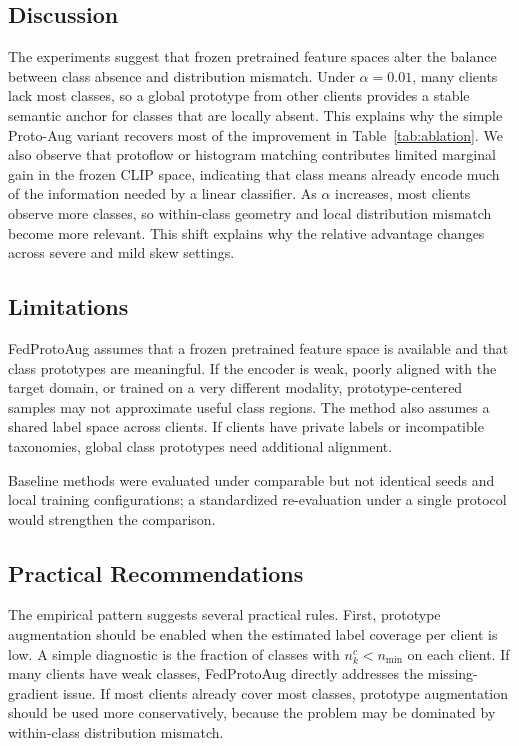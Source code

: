 ﻿\documentclass[runningheads]{llncs}
\newcommand{\method}{FedProtoAug}
\newcommand{\clip}{CLIP}
\begin{document}
\subsection{Discussion}
The experiments suggest that frozen pretrained feature spaces alter the balance between class absence and distribution mismatch. Under $\alpha=0.01$, many clients lack most classes, so a global prototype from other clients provides a stable semantic anchor for classes that are locally absent. This explains why the simple Proto-Aug variant recovers most of the improvement in Table~\ref{tab:ablation}. We also observe that protoflow or histogram matching contributes limited marginal gain in the frozen \clip{} space, indicating that class means already encode much of the information needed by a linear classifier. As $\alpha$ increases, most clients observe more classes, so within-class geometry and local distribution mismatch become more relevant. This shift explains why the relative advantage changes across severe and mild skew settings.

\subsection{Limitations}
\method{} assumes that a frozen pretrained feature space is available and that class prototypes are meaningful. If the encoder is weak, poorly aligned with the target domain, or trained on a very different modality, prototype-centered samples may not approximate useful class regions. The method also assumes a shared label space across clients. If clients have private labels or incompatible taxonomies, global class prototypes need additional alignment.

Baseline methods were evaluated under comparable but not identical seeds and local training configurations; a standardized re-evaluation under a single protocol would strengthen the comparison.

\subsection{Practical Recommendations}
The empirical pattern suggests several practical rules. First, prototype augmentation should be enabled when the estimated label coverage per client is low. A simple diagnostic is the fraction of classes with $n_k^c<n_{\min}$ on each client. If many clients have weak classes, \method{} directly addresses the missing-gradient issue. If most clients already cover most classes, prototype augmentation should be used more conservatively, because the problem may be dominated by within-class distribution mismatch.
\end{document}
